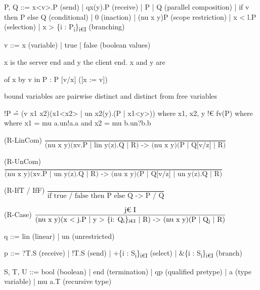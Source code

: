 \documentclass[landscape, a4paper]{article}
\begin{document}
\begin{minipage}[t]{0.19\linewidth}
	\raggedright

	\begin{betterlist}
		\item {} P, Q ::= x<v>.P (send) | qx(y).P (receive) | P | Q (parallel composition) | if v then P else Q (conditional) | 0 (inaction) | (nu x y)P (scope restriction) | x < l.P (selection) | x > \{i : P\textsubscript{i}\}\textsubscript{i€I} (branching)
		\item {} v ::= x (variable) | true | false (boolean values)
		\item x is the server end and y the client end. x and y are 
		\begin{betterlist}
			\item {} of x by v in P : P [v/x] ([x := v])
			\item {} bound variables are pairwise distinct and distinct from free variables
			\item !P \^= (v x1 x2)(x1<x2> | un x2(y).(P | x1<y>)) where x1, x2, y !€ fv(P) where where x1 = mu a.un!a.a and x2 = mu b.un?b.b
		\end{betterlist}
		\item \nul{Reduction rules (P -> P):}
		\begin{betterlist}
			\item (R-LinCom) $\dfrac{}{\text{(nu x y)(xv.P | lin y(z).Q | R) -> (nu x y)(P | Q[v/z] | R)}}$
			\item (R-UnCom) $\dfrac{}{\text{(nu x y)(xv.P | un y(z).Q | R) -> (nu x y)(P | Q[v/z] | un y(z).Q | R)}}$
			\item (R-IfT / IfF) $\dfrac{}{\text{if true / false then P else Q -> P / Q}}$
			\item (R-Case) $\dfrac{\text{j€ I}}{\text{(nu x y)(x < j.P | y > \{i: Q\textsubscript{i}\}\textsubscript{i€I} | R) -> (nu x y)(P | Q\textsubscript{j} | R)}}$
		\end{betterlist}
		\item \nul{Types:}
		\begin{betterlist}
			\item {} q ::= lin (linear) | un (unrestricted)
			\item {} p ::= ?T.S (receive) | !T.S (send) | +\{i : S\textsubscript{i}\}\textsubscript{i€I} (select) | \&\{i : S\textsubscript{i}\}\textsubscript{i€I} (branch)
			\item {} S, T, U ::= bool (boolean) | end (termination) | qp (qualified pretype) | a (type variable) | mu a.T (recursive type)

\end{betterlist}
\end{betterlist}
\end{minipage}
\end{document}
